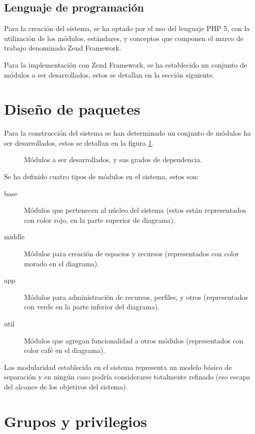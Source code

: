 \subsection{Lenguaje de programación}

Para la creación del sistema, se ha optado por el uso del lenguaje PHP 5, con la
utilización de los módulos, estándares, y conceptos que componen el marco de
trabajo denominado Zend Framework.

Para la implementación con Zend Framework, se ha establecido un conjunto de
módulos a ser desarrollados, estos se detallan en la sección siguiente.

\section{Diseño de paquetes}

Para la construcción del sistema se han determinado un conjunto de módulos ha
ser desarrollados, estos se detallan en la figura \ref{paquetes}.

\begin{figure}
\centering

\caption{Módulos a ser desarrollados, y sus grados de dependencia.}
\label{paquetes}
\end{figure}

Se ha definido cuatro tipos de módulos en el sistema, estos son:

\begin{description}
\item [base] Módulos que pertenecen al núcleo del sistema (estos están
representados con color rojo, en la parte superior de diagrama).
\item [middle] Módulos para creación de espacios y recursos (representados con
color morado en el diagrama).
\item [app] Módulos para administración de recursos, perfiles, y otros
(representados con verde en la parte inferior del diagrama).
\item [util] Módulos que agregan funcionalidad a otros módulos (representados
con color café en el diagrama).
\end{description}

Las modularidad establecida en el sistema representa un modelo básico de
separación y en ningún caso podría considerarse totalmente refinado (eso escapa
del alcance de los objetivos del sistema).

\section{Grupos y privilegios}

